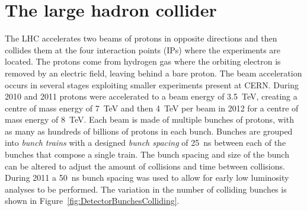 \section{The large hadron collider}\label{sec:the_large_hadron_collider}

The LHC accelerates two beams of protons in opposite directions and then collides them at the four interaction points (IPs) where the experiments are located. The protons come from hydrogen gas where the orbiting electron is removed by an electric field, leaving behind a bare proton. The beam acceleration occurs in several stages exploiting smaller experiments present at CERN. During 2010 and 2011 protons were accelerated to a beam energy of \SI{3.5}{\TeV}, creating a centre of mass energy of \SI{7}{\TeV} and then \SI{4}{\TeV} per beam in 2012 for a centre of mass energy of \SI{8}{\TeV}. Each beam is made of multiple bunches of protons, with as many as hundreds of billions of protons in each bunch. Bunches are grouped into \textit{bunch trains} with a designed \textit{bunch spacing} of \SI{25}{\ns} between each of the bunches that compose a single train. The bunch spacing and size of the bunch can be altered to adjust the amount of collisions and time between collisions. During 2011 a \SI{50}{\ns} bunch spacing was used to allow for early low luminosity analyses to be performed. The variation in the number of colliding bunches is shown in Figure~\ref{fig:DetectorBunchesColliding}.

